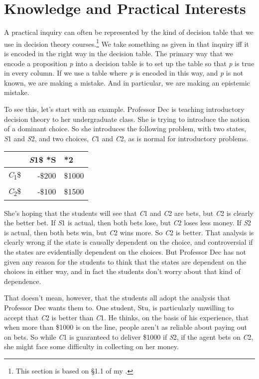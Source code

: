 \documentclass[
  11pt,
]{book}
\begin{document}
\hypertarget{structure}{%
\section{Knowledge and Practical Interests}\label{structure}}

A practical inquiry can often be represented by the kind of decision table that we use in decision theory courses.\footnote{This section is based on §1.1 of my \citeyearpar{Weatherson2012}.} We take something as given in that inquiry iff it is encoded in the right way in the decision table. The primary way that we encode a proposition \emph{p} into a decision table is to set up the table so that \emph{p} is true in every column. If we use a table where \emph{p} is encoded in this way, and \emph{p} is not known, we are making a mistake. And in particular, we are making an epistemic mistake.

To see this, let's start with an example. Professor Dec is teaching introductory decision theory to her undergraduate class. She is trying to introduce the notion of a dominant choice. So she introduces the following problem, with two states, \emph{S}1 and \emph{S}2, and two choices, \emph{C}1 and \emph{C}2, as is normal for introductory problems.

\begin{longtable}[]{@{}crl@{}}
\toprule()
~ & \emph{S}1\$ *S & *2 \\
\midrule()
\endhead
\emph{C}\textsubscript{1}\$ & -\$200 & \$1000 \\
\emph{C}\textsubscript{2}\$ & -\$100 & \$1500 \\
\bottomrule()
\end{longtable}

She's hoping that the students will see that \emph{C}1 and \emph{C}2 are bets, but \emph{C}2 is clearly the better bet. If \emph{S}1 is actual, then both bets lose, but \emph{C}2 loses less money. If \emph{S}2 is actual, then both bets win, but \emph{C}2 wins more. So \emph{C}2 is better. That analysis is clearly wrong if the state is causally dependent on the choice, and controversial if the states are evidentially dependent on the choices. But Professor Dec has not given any reason for the students to think that the states are dependent on the choices in either way, and in fact the students don't worry about that kind of dependence.

That doesn't mean, however, that the students all adopt the analysis that Professor Dec wants them to. One student, Stu, is particularly unwilling to accept that \emph{C}2 is better than \emph{C}1. He thinks, on the basis of his experience, that when more than \$1000 is on the line, people aren't as reliable about paying out on bets. So while \emph{C}1 is guaranteed to deliver \$1000 if \emph{S}2, if the agent bets on \emph{C}2, she might face some difficulty in collecting on her money.
\end{document}
